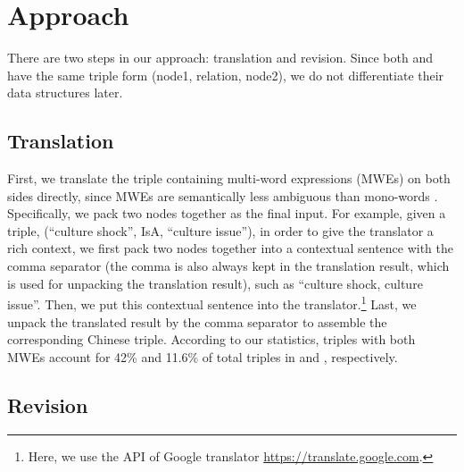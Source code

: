 \section{Approach}
\label{sec:approach}
There are two steps in our approach: translation and revision.
Since both \pro and \con have the same triple form (node1, relation, node2), we do not differentiate their data structures later.

\subsection{Translation}
First, we translate the triple containing multi-word expressions (MWEs) on both sides directly, since MWEs are semantically less ambiguous than mono-words \cite{finlayson2011detecting}.
Specifically, we pack two nodes together as the final input. For example, given a triple, (``culture shock'', IsA, ``culture issue''), 
in order to give the translator a rich context, we first pack two nodes together into a  
contextual sentence with the comma separator (the comma is also always kept in the translation result, which is used for unpacking the translation result), such as ``culture shock, culture issue''.
Then, we put this contextual sentence into the translator.\footnote{Here, we use the API of Google translator \url{https://translate.google.com}.}
Last, we unpack the translated result by the comma separator to assemble the corresponding Chinese triple.
According to our statistics, triples with both MWEs account for 42\% and 11.6\% of total triples in \pro and \con, respectively.

\subsection{Revision}
%
%
%
%
%

